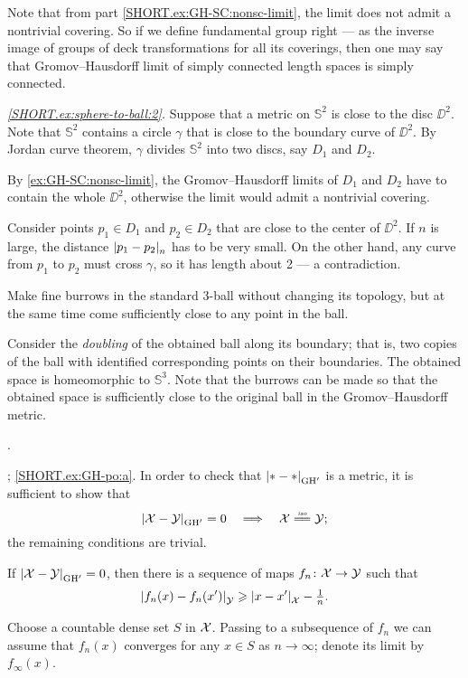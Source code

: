 Note that from part \ref{SHORT.ex:GH-SC:nonsc-limit}, the limit does not admit a nontrivial covering.
So if we define fundamental group right --- as the inverse image of groups of deck transformations for all its coverings, then one may say that Gromov--Hausdorff limit of simply connected length spaces is simply connected.

\parbf{\ref{ex:sphere-to-ball},}
\textit{\ref{SHORT.ex:sphere-to-ball:2}.}
Suppose that a metric on $\mathbb{S}^2$ is close to the disc $\DD^2$.
Note that $\mathbb{S}^2$ contains a circle $\gamma$ that is close to the boundary curve of $\DD^2$.
By Jordan curve theorem, $\gamma$ divides $\mathbb{S}^2$ into two discs, say $D_1$ and $D_2$.

By \ref{ex:GH-SC:nonsc-limit}, the Gromov--Hausdorff limits of $D_1$ and $D_2$ have to contain the whole $\DD^2$, otherwise the limit would admit a nontrivial covering.

Consider points $p_1\in D_1$ and $p_2\in D_2$ that are close to the center of $\DD^2$.
If $n$ is large, the distance $\dist{p_1}{p_2}{n}$ has to be very small.
On the other hand, any curve from $p_1$ to $p_2$ must cross $\gamma$, so it has length about 2 --- a contradiction.

Make fine burrows in the standard 3-ball without changing its topology,
but at the same time come sufficiently close to any point in the ball.

Consider the \emph{doubling} of the obtained ball along its boundary;
that is, two copies of the ball with identified corresponding points on their boundaries.
The obtained space is homeomorphic to $\mathbb{S}^3$.
Note that the burrows can be made 
so that the obtained space is sufficiently close to the original ball 
in the Gromov--Hausdorff metric.

 \cite[Exercises 7.5.13 and 7.5.17]{burago-burago-ivanov}. 

\parbf{\ref{ex:GH-po}}; \ref{SHORT.ex:GH-po:a}.
In order to check that $\dist{*}{*}{\GH'}$ is a metric, it is sufficient to show that
\[\dist{\spc{X}}{\spc{Y}}{\GH'}=0 
\quad\Longrightarrow\quad
\spc{X}\iso\spc{Y};\]
the remaining conditions are trivial.

If $\dist{\spc{X}}{\spc{Y}}{\GH'}=0$, then there is a sequence of maps $f_n\colon\mathcal{X}\to \mathcal{Y}$ such that 
\[\dist{f_n(x)}{f_n(x')}{\spc{Y}}\ge \dist{x}{x'}{\spc{X}}-\tfrac1n.\]

Choose a countable dense set $S$ in $\mathcal{X}$.
Passing to a subsequence of $f_n$ we can assume that $f_n(x)$ converges for any $x\in S$ as $n\to\infty$;
denote its limit by $f_\infty(x)$.

